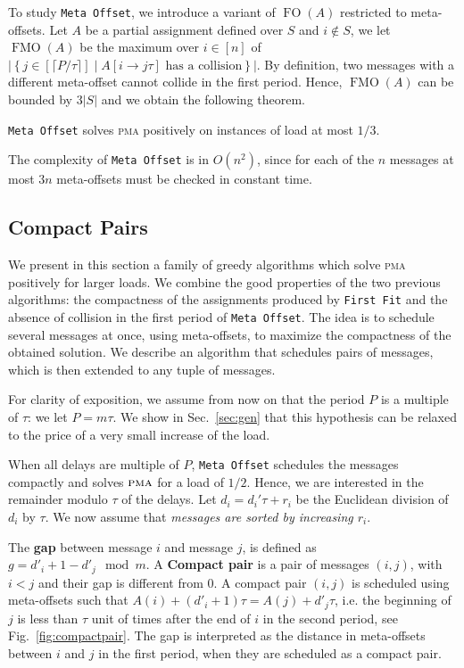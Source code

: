 \documentclass[a4paper,UKenglish,cleveref, autoref, thm-restate]{lipics-v2019}
\DeclareMathOperator{\Fo}{FO}
\DeclareMathOperator{\Fmo}{FMO}
\newcommand\pma{\textsc{pma}\xspace}
\newcommand\firstfit{\texttt{First Fit}\xspace}
\newcommand\metaoffset{\texttt{Meta Offset}\xspace}
\begin{document}
To study \metaoffset, we introduce a variant of $\Fo(A)$ restricted to meta-offsets.
 Let $A$ be a partial assignment defined over $S$ and $i\notin S$, we let $\Fmo(A)$ be the maximum over $i \in [n]$ of $|\left\{ j \in [\lceil P / \tau \rceil] \mid A[i \rightarrow j\tau] \text{ has a collision}\right\}|$.
 By definition, two messages with a different meta-offset cannot collide in the first period. Hence, $\Fmo(A)$ can be bounded by $3|S|$ and we obtain the following theorem.


\begin{theorem}\label{th:metaoffset}
\metaoffset solves \pma positively on instances of load at most $1/3$.
\end{theorem}

The complexity of \metaoffset is in $O(n^2)$, since for each of the $n$ messages at most $3n$ meta-offsets must be checked in constant time. 

\subsection{Compact Pairs}

We present in this section a family of greedy algorithms which solve \pma positively for larger loads. We combine the good properties of the two previous algorithms: the compactness of the assignments produced by \firstfit and the absence of collision in the first period of \metaoffset. The idea is to schedule several messages at once, using meta-offsets, to maximize the compactness of the obtained solution. We describe an algorithm that schedules pairs of messages, which is then extended to any tuple of messages. 

For clarity of exposition, we assume from now on that the period $P$ is a multiple of $\tau$: we let $P = m\tau$. We show in Sec.~\ref{sec:gen} that this hypothesis can be relaxed to the price of a very small increase of the load. 


When all delays are multiple of $P$, \metaoffset schedules the messages compactly and solves $\pma$ for a load of $1/2$. Hence, we are interested in the remainder modulo $\tau$ of the delays. Let $d_i = d_{i}'\tau + r_i$ be the Euclidean division of $d_i$ by $\tau$. We now assume that \emph{messages are sorted by increasing $r_i$}.

The \textbf{gap} between message $i$ and message $j$, is defined as $g = d'_{i} + 1 - d'_{j} \mod m$.
A \textbf{Compact pair} is a pair of messages $(i,j)$, with $i < j$ and their gap is different from $0$. A compact pair $(i,j)$ is scheduled using meta-offsets such that $A(i) + (d'_i+1)\tau = A(j) + d'_j\tau$, i.e. the beginning of $j$ is less than $\tau$ unit of times after the end of $i$ in the second period, see Fig.~\ref{fig:compactpair}. The gap is interpreted as the distance in meta-offsets between $i$ and $j$ in the first period, when they are scheduled as a compact pair.
\end{document}
